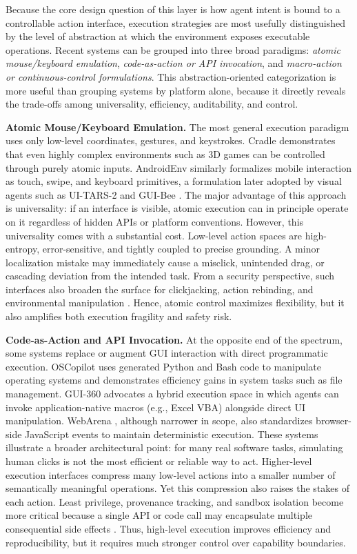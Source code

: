 Because the core design question of this layer is how agent intent is bound to a controllable action interface, execution strategies are most usefully distinguished by the level of abstraction at which the environment exposes executable operations. Recent systems can be grouped into three broad paradigms: \emph{atomic mouse/keyboard emulation}, \emph{code-as-action or API invocation}, and \emph{macro-action or continuous-control formulations}. This abstraction-oriented categorization is more useful than grouping systems by platform alone, because it directly reveals the trade-offs among universality, efficiency, auditability, and control.

\textbf{Atomic Mouse/Keyboard Emulation.}  
The most general execution paradigm uses only low-level coordinates, gestures, and keystrokes. Cradle \cite{tan2024cradle} demonstrates that even highly complex environments such as 3D games can be controlled through purely atomic inputs. AndroidEnv \cite{toyama2021androidenv} similarly formalizes mobile interaction as touch, swipe, and keyboard primitives, a formulation later adopted by visual agents such as UI-TARS-2 and GUI-Bee \cite{wang2025ui,fan2025gui}. The major advantage of this approach is universality: if an interface is visible, atomic execution can in principle operate on it regardless of hidden APIs or platform conventions. However, this universality comes with a substantial cost. Low-level action spaces are high-entropy, error-sensitive, and tightly coupled to precise grounding. A minor localization mistake may immediately cause a misclick, unintended drag, or cascading deviation from the intended task. From a security perspective, such interfaces also broaden the surface for clickjacking, action rebinding, and environmental manipulation \cite{qian2026zero,zhang2026realistic}. Hence, atomic control maximizes flexibility, but it also amplifies both execution fragility and safety risk.

\textbf{Code-as-Action and API Invocation.}  
At the opposite end of the spectrum, some systems replace or augment GUI interaction with direct programmatic execution. OSCopilot \cite{wu2024copilot} uses generated Python and Bash code to manipulate operating systems and demonstrates efficiency gains in system tasks such as file management. GUI-360 \cite{mu2025gui} advocates a hybrid execution space in which agents can invoke application-native macros (e.g., Excel VBA) alongside direct UI manipulation. WebArena \cite{zhou2023webarena}, although narrower in scope, also standardizes browser-side JavaScript events to maintain deterministic execution. These systems illustrate a broader architectural point: for many real software tasks, simulating human clicks is not the most efficient or reliable way to act. Higher-level execution interfaces compress many low-level actions into a smaller number of semantically meaningful operations. Yet this compression also raises the stakes of each action. Least privilege, provenance tracking, and sandbox isolation become more critical because a single API or code call may encapsulate multiple consequential side effects \cite{jones2025systematization,zhang2025mcp}. Thus, high-level execution improves efficiency and reproducibility, but it requires much stronger control over capability boundaries.

